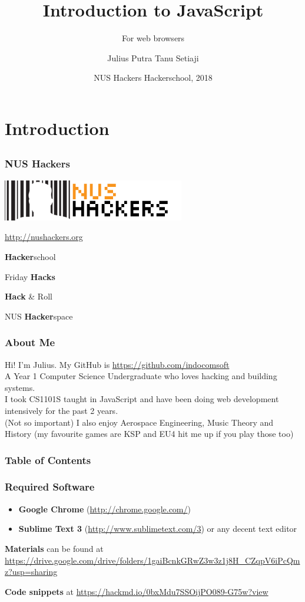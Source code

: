 \documentclass[handout,12pt]{beamer}
\title{Introduction to JavaScript}
\subtitle{For web browsers}
\author{Julius Putra Tanu Setiaji}
\date{NUS Hackers Hackerschool, 2018}
\begin{document}
	\frame{\titlepage}
	
	\section{Introduction}
	\subsection{}
	\begin{frame}
		\frametitle{NUS Hackers}
		\begin{center}
			
\includegraphics[width=0.5\linewidth]{NUSHackers}

\url{http://nushackers.org}
\end{center}

\begin{center}
	\textbf{Hacker}school
	
	Friday \textbf{Hacks}
	
	\textbf{Hack} \& Roll
	
	NUS \textbf{Hacker}space
\end{center}

	\end{frame}
	
	\begin{frame}
		\frametitle{About Me}
		Hi! I'm Julius. My GitHub is \url{https://github.com/indocomsoft}\\
				
		A Year 1 Computer Science Undergraduate who loves hacking and building systems.\\
			
		I took CS1101S taught in JavaScript and have been doing web development intensively for the past 2 years.\\
		
		(Not so important) I also enjoy Aerospace Engineering, Music Theory and History {\tiny (my favourite games are KSP and EU4 hit me up if you play those too)}
	\end{frame}
	
	\begin{frame}
		\frametitle{Table of Contents}
		\tableofcontents
	\end{frame}
	
	
	\begin{frame}
		\frametitle{Required Software}
		\begin{itemize}
			\item \textbf{Google Chrome} (\url{http://chrome.google.com/})
			\item \textbf{Sublime Text 3} (\url{http://www.sublimetext.com/3}) or any decent text editor
		\end{itemize}
		
		\textbf{Materials} can be found at \url{https://drive.google.com/drive/folders/1gaiBcnkGRwZ3w3z1j8H_CZqpV6iPcQmz?usp=sharing}
		
		\textbf{Code snippets} at \url{https://hackmd.io/0bxMdu7SSOijPO089-G75w?view}
	\end{frame}
	
\end{document}
